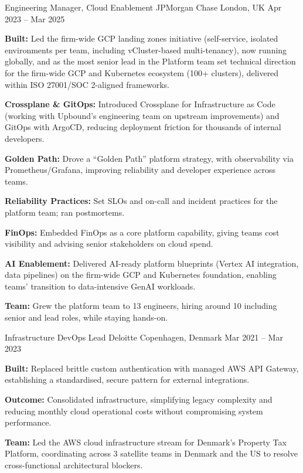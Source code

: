 \begin{cventries}
  \vspace{3mm}
  \cventry
  {Engineering Manager, Cloud Enablement}
  {JPMorgan Chase}
  {London, UK}
  {Apr 2023 -- Mar 2025}
  {
    \begin{cvitems}
      \item {\textbf{Built:} Led the firm-wide GCP landing zones initiative (self-service, isolated environments per team, including vCluster-based multi-tenancy), now running globally, and as the most senior lead in the
                Platform team set technical direction for the firm-wide GCP and Kubernetes ecosystem (100+ clusters), delivered
                within ISO 27001/SOC 2-aligned frameworks.}
      \item {\textbf{Crossplane \& GitOps:} Introduced Crossplane for Infrastructure as Code (working with Upbound's engineering
                team on upstream improvements) and GitOps with ArgoCD, reducing deployment friction for thousands of internal
                developers.}
      \item {\textbf{Golden Path:} Drove a ``Golden Path'' platform strategy, with observability via Prometheus/Grafana,
                improving reliability and developer experience across teams.}
      \item {\textbf{Reliability Practices:} Set SLOs and on-call and incident practices for the platform team; ran postmortems.}
      \item {\textbf{FinOps:} Embedded FinOps as a core platform capability, giving teams cost visibility and advising senior stakeholders on cloud spend.}
      \item {\textbf{AI Enablement:} Delivered AI-ready platform blueprints (Vertex AI integration, data pipelines) on the firm-wide
                GCP and Kubernetes foundation, enabling teams' transition to data-intensive GenAI workloads.}
      \item {\textbf{Team:} Grew the platform team to 13 engineers, hiring around 10 including senior and lead roles, while staying hands-on.}
    \end{cvitems}
  }

  \cventry
  {Infrastructure DevOps Lead}
  {Deloitte}
  {Copenhagen, Denmark}
  {Mar 2021 -- Mar 2023}
  {
    \begin{cvitems}
      \item {\textbf{Built:} Replaced brittle custom authentication with managed AWS API Gateway, establishing a standardised, secure
                pattern for external integrations.}
      \item {\textbf{Outcome:} Consolidated infrastructure, simplifying legacy complexity and reducing monthly cloud operational costs
                without compromising system performance.}
      \item {\textbf{Team:} Led the AWS cloud infrastructure stream for Denmark's Property Tax Platform, coordinating across 3 satellite
                teams in Denmark and the US to resolve cross-functional architectural blockers.}
    \end{cvitems}
  }


\end{cventries}
